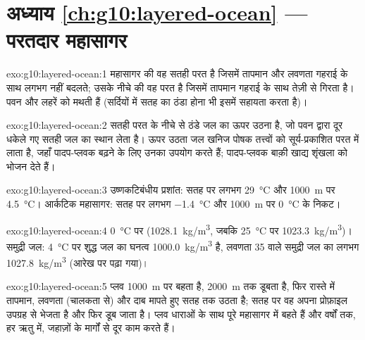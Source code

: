 \section*{अध्याय \ref{ch:g10:layered-ocean} --- परतदार महासागर}

\begin{solution}{exo:g10:layered-ocean:1}
 महासागर की वह सतही परत है जिसमें तापमान और
लवणता गहराई के साथ लगभग नहीं बदलते;  उसके नीचे की वह परत है जिसमें
तापमान गहराई के साथ तेज़ी से गिरता है। पवन और लहरें
 को मथती हैं (सर्दियों में सतह का ठंडा होना भी इसमें सहायता करता है)।
\end{solution}

\begin{solution}{exo:g10:layered-ocean:2}
 सतही परत के नीचे से ठंडे जल का ऊपर उठना है, जो पवन द्वारा
दूर धकेले गए सतही जल का स्थान लेता है। ऊपर उठता जल खनिज
पोषक तत्त्वों को सूर्य-प्रकाशित परत में लाता है, जहाँ पादप-प्लवक बढ़ने के लिए उनका उपयोग करते हैं;
पादप-प्लवक बाक़ी खाद्य शृंखला को भोजन देते हैं।
\end{solution}

\begin{solution}{exo:g10:layered-ocean:3}
उष्णकटिबंधीय प्रशांत: सतह पर लगभग \qty{29}{\degreeCelsius} और
\qty{1000}{m} पर \qty{4.5}{\degreeCelsius}। आर्कटिक महासागर: सतह पर लगभग
\qty{-1.4}{\degreeCelsius} और \qty{1000}{m} पर
\qty{0}{\degreeCelsius} के निकट।
\end{solution}

\begin{solution}{exo:g10:layered-ocean:4}
\qty{0}{\degreeCelsius} पर (\qty{1028.1}{kg/m^3}, जबकि
\qty{25}{\degreeCelsius} पर \qty{1023.3}{kg/m^3})। समुद्री जल: \qty{4}{\degreeCelsius} पर शुद्ध जल
का घनत्व \qty{1000.0}{kg/m^3} है, लवणता 35 वाले समुद्री जल का लगभग
\qty{1027.8}{kg/m^3} (आरेख पर पढ़ा गया)।
\end{solution}

\begin{solution}{exo:g10:layered-ocean:5}
प्लव \qty{1000}{m} पर बहता है, \qty{2000}{m} तक डूबता है, फिर रास्ते में
तापमान, लवणता (चालकता से) और दाब मापते हुए सतह तक उठता है;
सतह पर वह अपना प्रोफ़ाइल उपग्रह से भेजता है और फिर डूब जाता है।
प्लव धाराओं के साथ पूरे महासागर में बहते हैं और वर्षों तक, हर
ऋतु में, जहाज़ों के मार्गों से दूर काम करते हैं।
\end{solution}

